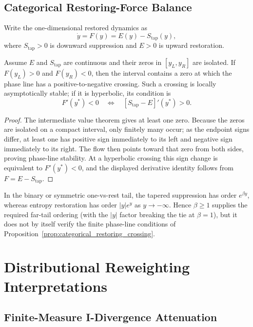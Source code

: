 \subsection{Categorical Restoring-Force Balance}
\label{app:categorical_restoring_balance}

Write the one-dimensional restored dynamics as
\[
\dot y=F(y)=E(y)-S_{\mathrm{tap}}(y),
\]
where \(S_{\mathrm{tap}}>0\) is downward suppression and \(E>0\) is
upward restoration.

\begin{proposition}
\label{prop:categorical_restoring_crossing}
Assume \(E\) and \(S_{\mathrm{tap}}\) are continuous and their zeros in
\([y_L,y_R]\) are isolated. If
\(F(y_L)>0\) and \(F(y_R)<0\), then the interval contains a zero at
which the phase line has a positive-to-negative crossing. Such a
crossing is locally asymptotically stable; if it is hyperbolic, its
condition is
\[
F'(y^*)<0
\quad\Longleftrightarrow\quad
[S_{\mathrm{tap}}-E]'(y^*)>0.
\]
\end{proposition}

\begin{proof}
The intermediate value theorem gives at least one zero. Because the
zeros are isolated on a compact interval, only finitely many occur; as
the endpoint signs differ, at least one has positive sign immediately
to its left and negative sign immediately to its right. The flow then
points toward that zero from both sides, proving phase-line stability. At a
hyperbolic crossing this sign change is equivalent to \(F'(y^*)<0\),
and the displayed derivative identity follows from \(F=E-S_{\mathrm{tap}}\).
\end{proof}

In the binary or symmetric one-vs-rest tail, the tapered suppression
has order \(e^{\beta y}\), whereas entropy restoration has order
\(|y|e^y\) as \(y\to-\infty\). Hence \(\beta\ge1\) supplies the
required far-tail ordering (with the \(|y|\) factor breaking the tie at
\(\beta=1\)), but it does not by itself verify the finite phase-line
conditions of Proposition~\ref{prop:categorical_restoring_crossing}.

\section{Distributional Reweighting Interpretations}
\label{app:distributional_reweighting}

\subsection{Finite-Measure I-Divergence Attenuation}
\label{app:finite_measure_variational}

